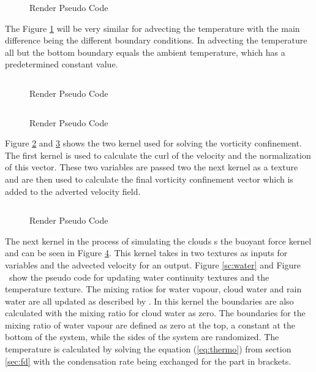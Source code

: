 \begin{figure}[h]
\centering
\begin{lstlisting}

\end{lstlisting}
\caption{Render Pseudo Code}
\label{sc:AdvectionPseudoCode}
\end{figure}

The Figure \ref{sc:AdvectionPseudoCode} will be very similar for advecting the temperature with the main difference being the different boundary conditions.
In advecting the temperature all but the bottom boundary equals the ambient temperature, which has a predetermined constant value.

\begin{figure}[h]
\centering
\begin{lstlisting}

\end{lstlisting}
\caption{Render Pseudo Code}
\label{sc:vorticity confinement_one}
\end{figure}

\begin{figure}[h]
\centering
\begin{lstlisting}

\end{lstlisting}
\caption{Render Pseudo Code}
\label{sc:vorticity confinement_two}
\end{figure}

Figure \ref{sc:vorticity confinement_one} and \ref{sc:vorticity confinement_two} shows the two kernel used for solving the vorticity confinement.
The first kernel is used to calculate the curl of the velocity and the normalization of this vector.
These two variables are passed two the next kernel as a texture and are then used to calculate the final vorticity confinement vector which is added to the adverted velocity field.

\begin{figure}[h]
\centering
\begin{lstlisting}

\end{lstlisting}
\caption{Render Pseudo Code}
\label{sc:buoyant force}
\end{figure}

The next kernel in the process of simulating the clouds s the buoyant force kernel and can be seen in Figure \ref{sc:buoyant force}.
This kernel takes in two textures as inputs for variables and the advected velocity for an output.
Figure \ref{sc:water} and Figure \ show the pseudo code for updating water continuity textures and the temperature texture. 
The mixing ratios for water vapour, cloud water and rain water are all updated as described by \cite{houze1994cloud}.
In this kernel the boundaries are also calculated with the mixing ratio for cloud water as zero.
The boundaries for the mixing ratio of water vapour are defined as zero at the top, a constant at the bottom of the system, while the sides of the system are randomized.
The temperature is calculated by solving the equation (\ref{eq:thermo}) from section \ref{sec:fd} with the condensation rate being exchanged for the part in brackets.

